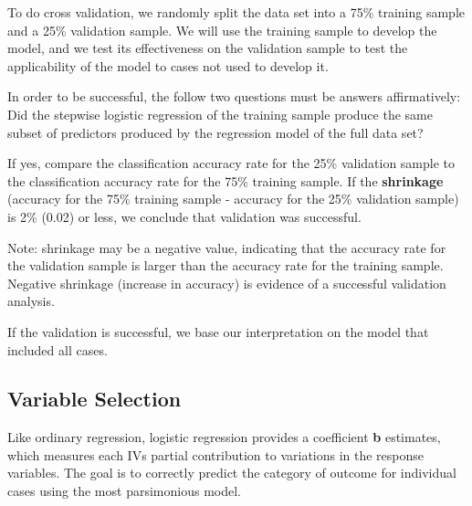 \documentclass[a4paper,12pt]{article}
\begin{document}
To do cross validation, we randomly split the data set into a 75\% training sample and a 25\% validation sample. We will use the training sample to develop the model, and we test its effectiveness on the validation sample to test the applicability of the model to cases not used to develop it.

In order to be successful, the follow two questions must be answers affirmatively:
Did the stepwise logistic regression of the training sample produce the same subset of predictors produced by the regression model of the full data set?

If yes, compare the classification accuracy rate for the 25\% validation sample to the classification accuracy rate for the 75\% training sample. If the \textbf{shrinkage} (accuracy for the 75\% training sample - accuracy for the 25\% validation sample) is 2\% (0.02) or less, we conclude that validation was successful.

Note: shrinkage may be a negative value, indicating that the accuracy rate for the validation sample is larger than the accuracy rate for the training sample. Negative shrinkage (increase in accuracy) is evidence of a successful validation analysis.

If the validation is successful, we base our interpretation on the model that included all cases.

\subsection{Variable Selection}
Like ordinary regression, logistic regression provides a coefficient \textbf{b} estimates, which measures
each IVs partial contribution to variations in the response variables. The goal is to correctly predict
the category of outcome for individual cases using the most parsimonious model.
\end{document}
